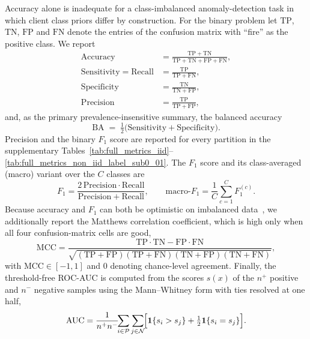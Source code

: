\documentclass[journal]{IEEEtran}
\begin{document}
Accuracy alone is inadequate for a class-imbalanced anomaly-detection task in which client class priors differ by construction. For the binary problem let $\mathrm{TP}$, $\mathrm{TN}$, $\mathrm{FP}$ and $\mathrm{FN}$ denote the entries of the confusion matrix with ``fire'' as the positive class. We report
\begin{align}
\mathrm{Accuracy} &= \frac{\mathrm{TP}+\mathrm{TN}}{\mathrm{TP}+\mathrm{TN}+\mathrm{FP}+\mathrm{FN}}, \label{eq:acc}\\[2pt]
\mathrm{Sensitivity} = \mathrm{Recall} &= \frac{\mathrm{TP}}{\mathrm{TP}+\mathrm{FN}}, \label{eq:sens}\\[2pt]
\mathrm{Specificity} &= \frac{\mathrm{TN}}{\mathrm{TN}+\mathrm{FP}}, \label{eq:spec}\\[2pt]
\mathrm{Precision} &= \frac{\mathrm{TP}}{\mathrm{TP}+\mathrm{FP}}, \label{eq:prec}
\end{align}
and, as the primary prevalence-insensitive summary, the balanced accuracy
\begin{equation}
\mathrm{BA} \;=\; \tfrac{1}{2}\bigl(\mathrm{Sensitivity} + \mathrm{Specificity}\bigr).
\label{eq:ba}
\end{equation}
Precision and the binary $F_1$ score are reported for every partition in the supplementary Tables~\ref{tab:full_metrics_iid}--\ref{tab:full_metrics_non_iid_label_sub0_01}. The $F_1$ score and its class-averaged (macro) variant over the $C$ classes are
\begin{equation}
F_1 = \frac{2\,\mathrm{Precision}\cdot\mathrm{Recall}}{\mathrm{Precision}+\mathrm{Recall}},
\qquad
\text{macro-}F_1 = \frac{1}{C}\sum_{c=1}^{C} F_1^{(c)} .
\label{eq:f1}
\end{equation}
Because accuracy and $F_1$ can both be optimistic on imbalanced data~\cite{chicco2020mcc}, we additionally report the Matthews correlation coefficient, which is high only when all four confusion-matrix cells are good,
\begin{equation}
\mathrm{MCC} = \frac{\mathrm{TP}\cdot\mathrm{TN} - \mathrm{FP}\cdot\mathrm{FN}}
{\sqrt{(\mathrm{TP}{+}\mathrm{FP})(\mathrm{TP}{+}\mathrm{FN})(\mathrm{TN}{+}\mathrm{FP})(\mathrm{TN}{+}\mathrm{FN})}} ,
\label{eq:mcc}
\end{equation}
with $\mathrm{MCC}\in[-1,1]$ and $0$ denoting chance-level agreement. Finally, the threshold-free ROC-AUC is computed from the scores $s(x)$ of the $n^{+}$ positive and $n^{-}$ negative samples using the Mann--Whitney form with ties resolved at one half,
\begin{equation}
\mathrm{AUC} = \frac{1}{n^{+}n^{-}}\!\!\sum_{i \in \mathcal{P}}\sum_{j \in \mathcal{N}}\!
\Bigl[\mathbf{1}\{s_i > s_j\} + \tfrac{1}{2}\mathbf{1}\{s_i = s_j\}\Bigr].
\label{eq:auc}
\end{equation}
\end{document}

